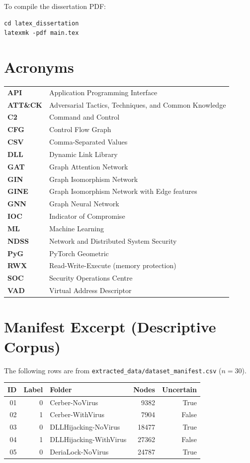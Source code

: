 To compile the dissertation PDF:

\begin{lstlisting}
cd latex_dissertation
latexmk -pdf main.tex
\end{lstlisting}

\section{Acronyms}
\begin{tabular}{ll}
\textbf{API} & Application Programming Interface \\
\textbf{ATT\&CK} & Adversarial Tactics, Techniques, and Common Knowledge \\
\textbf{C2} & Command and Control \\
\textbf{CFG} & Control Flow Graph \\
\textbf{CSV} & Comma-Separated Values \\
\textbf{DLL} & Dynamic Link Library \\
\textbf{GAT} & Graph Attention Network \\
\textbf{GIN} & Graph Isomorphism Network \\
\textbf{GINE} & Graph Isomorphism Network with Edge features \\
\textbf{GNN} & Graph Neural Network \\
\textbf{IOC} & Indicator of Compromise \\
\textbf{ML} & Machine Learning \\
\textbf{NDSS} & Network and Distributed System Security \\
\textbf{PyG} & PyTorch Geometric \\
\textbf{RWX} & Read-Write-Execute (memory protection) \\
\textbf{SOC} & Security Operations Centre \\
\textbf{VAD} & Virtual Address Descriptor \\
\end{tabular}

\section{Manifest Excerpt (Descriptive Corpus)}
\small
The following rows are from \texttt{extracted\_data/dataset\_manifest.csv} ($n{=}30$).
\begin{longtable}{rrlrr}
\toprule
\textbf{ID} & \textbf{Label} & \textbf{Folder} & \textbf{Nodes} & \textbf{Uncertain} \\
\midrule
\endhead
01 & 0 & Cerber-NoVirus & 9382 & True \\
02 & 1 & Cerber-WithVirus & 7904 & False \\
03 & 0 & DLLHijacking-NoVirus & 18477 & True \\
04 & 1 & DLLHijacking-WithVirus & 27362 & False \\
05 & 0 & DeriaLock-NoVirus & 24787 & True \\
\bottomrule
\end{longtable}

